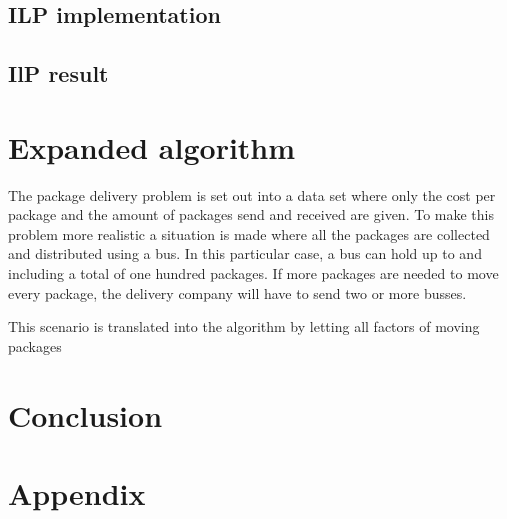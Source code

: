 \documentclass{article}
\begin{document}
    \subsection{ILP implementation}
    \subsection{IlP result}



\newpage
\section{Expanded algorithm}
The package delivery problem is set out into a data set where only the cost per package and the amount of packages send and received are given. To make this problem more realistic a situation is made where all the packages are collected and distributed using a bus. In this particular case, a bus can hold up to and including a total of one hundred packages. If more packages are needed to move every package, the delivery company will have to send two or more busses. 

This scenario is translated into the algorithm by letting all factors of moving packages 

\newpage
\section{Conclusion}


\section{Appendix} 
\end{document}
